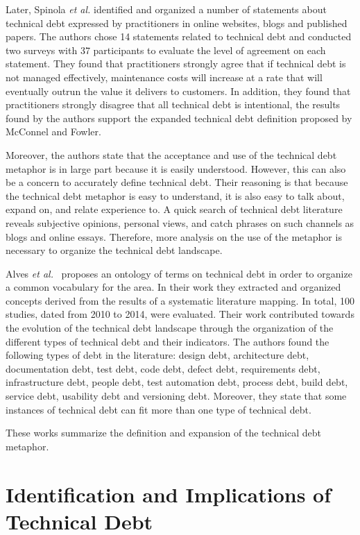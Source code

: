 Later, Spinola \textit{et al.} \cite{Spinola2013MTD} identified and organized a number of statements about technical debt expressed by practitioners in online websites, blogs and published papers. The authors chose 14 statements related to technical debt and conducted two surveys with 37 participants to evaluate the level of agreement on each statement. 
They found that practitioners strongly agree that if technical debt is not managed effectively, maintenance costs will increase at a rate that will eventually outrun the value it delivers to customers. In addition, they found that practitioners strongly disagree that all technical debt is intentional, the results found by the authors support the expanded technical debt definition proposed by McConnel and Fowler. 

Moreover, the authors state that the acceptance and use of the technical debt metaphor is in large part because it is easily understood. However, this can also be a concern to accurately define technical debt. Their reasoning is that because the technical debt metaphor is easy to understand, it is also easy to talk about, expand on, and relate experience to. A quick search of technical debt literature reveals subjective opinions, personal views, and catch phrases on such channels as blogs and online essays. Therefore, more analysis on the use of the metaphor is necessary to organize the technical debt landscape.

Alves \textit{et al.}~\cite{Alves2014MTD,Alves2016IST} proposes an ontology of terms on technical debt in order to organize a common vocabulary for the area. In their work they extracted and organized concepts derived from the results of a systematic literature mapping. In total, 100 studies, dated from 2010 to 2014, were evaluated. Their work contributed towards the evolution of the technical debt landscape through the organization of the different types of technical debt and their indicators. The authors found the following types of debt in the literature: design debt, architecture debt, documentation debt, test debt, code debt, defect debt, requirements debt, infrastructure debt, people debt, test automation debt, process debt, build debt, service debt, usability debt and versioning debt. Moreover, they state that some instances of technical debt can fit more than one type of technical debt. 

These works summarize the definition and expansion of the technical debt metaphor. 

\section{Identification and Implications of Technical Debt}

